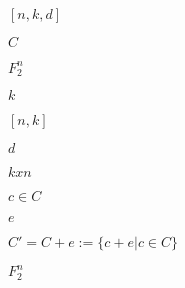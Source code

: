 \documentclass{article}
\begin{document}
$[n, k, d]$
\pagebreak

$C$
\pagebreak

$F^{n}_{2}$
\pagebreak

$k$
\pagebreak

$[n, k]$
\pagebreak

$d$
\pagebreak

$kxn$
\pagebreak

$c \in C$
\pagebreak

$e$
\pagebreak

$C' = C + e := \{ c + e | c \in C \}$
\pagebreak

$F_{2}^{n}$
\pagebreak
\end{document}
